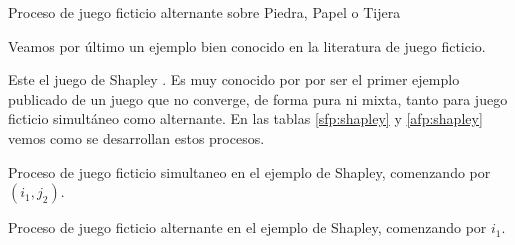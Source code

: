 \begin{table} %
    \centering
    
    \caption{Proceso de juego ficticio alternante sobre Piedra, Papel o Tijera}
    \label{afp:piedra:papel:tijera}
\end{table}

Veamos por último un ejemplo bien conocido en la literatura de juego ficticio.



Este el juego de Shapley \cite{shapley:3x3}. Es muy conocido por por ser el primer ejemplo publicado de un juego que no converge, de forma pura ni mixta, tanto para juego ficticio simultáneo como alternante. En las tablas \ref{sfp:shapley} y \ref{afp:shapley} vemos como se desarrollan estos procesos.


\begin{table} %
    \centering
    
    \caption{Proceso de juego ficticio simultaneo en el ejemplo de Shapley, comenzando por $(i_1, j_2)$.}
    \label{sfp:shapley}
\end{table}
\begin{table} %
    \centering
    
    \caption{Proceso de juego ficticio alternante en el ejemplo de Shapley, comenzando por $i_1$.}
    \label{afp:shapley}
\end{table}

